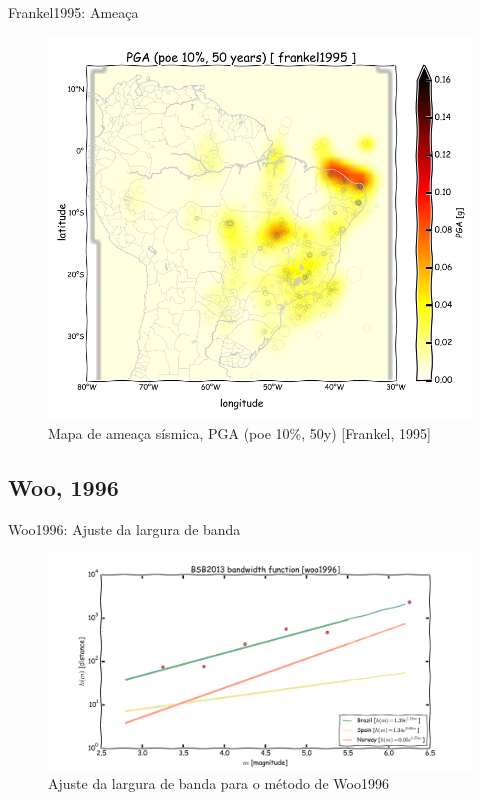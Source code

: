 \documentclass[ucs,8pt]{beamer}
\begin{document}
\begin{frame}{Frankel1995: Ameaça}
\begin{figure}[H]
  \centering
  \includegraphics[height=.95\textheight]{pga_frankel} 
  \caption{Mapa de ameaça sísmica, PGA (poe 10\%, 50y) [Frankel, 1995] }
  \label{fig:pga_fran} 
\end{figure}
\end{frame}





\subsection{Woo, 1996}


\begin{frame}{Woo1996: Ajuste da largura de banda}
\begin{figure}[H]
  \centering
  \includegraphics[width=.90\textwidth]{woo_bandwidth} 
  \caption{Ajuste da largura de banda para o método de Woo1996}
  \label{fig:woo_b} 
\end{figure}
\end{frame}
\end{document}
